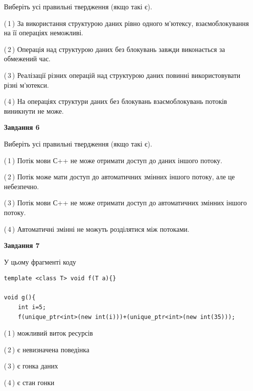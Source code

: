 \documentclass[12pt, ukrainian]{article}
\begin{document}
\begin {large}
{Виберіть усі правильні твердження (якщо такі є).\par
\vspace{2mm}

(\,1\,) За використання структурою даних рівно одного м’ютексу, взаємоблокування на її операціях неможливі.%

(\,2\,) Операція над структурою даних без блокувань завжди виконається за обмежений час.%

(\,3\,) Реалізації різних операцій над структурою даних повинні використовувати різні м’ютекси.%

(\,4\,) На операціях структури даних без блокувань взаємоблокувань потоків виникнути не може.%
\newpage


\begin{center}
\textbf{Завдання 6}
\end{center}

Виберіть усі правильні твердження (якщо такі є).\par
\vspace{2mm}

(\,1\,) Потік мови С++ не може отримати доступ до даних іншого потоку.%

(\,2\,) Потік може мати доступ до автоматичних змінних іншого потоку, але це небезпечно.%

(\,3\,) Потік мови С++ не може отримати доступ до автоматичних змінних іншого потоку.%

(\,4\,) Автоматичні змінні не можуть розділятися між потоками.%


\begin{center}
\textbf{Завдання 7}
\end{center}

У цьому фрагменті коду
\begin{verbatim}
template <class T> void f(T a){}

void g(){
    int i=5;
    f(unique_ptr<int>(new int(i)))+(unique_ptr<int>(new int(35)));
\end{verbatim}
(\,1\,) можливий виток ресурсів%

(\,2\,) є невизначена поведінка%

(\,3\,) є гонка даних%

(\,4\,) є стан гонки%

}
\end {large}

\vspace{4mm}
\newpage
\end{document}
